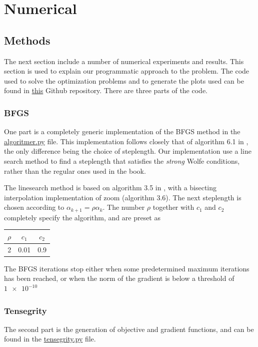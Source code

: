 \section{Numerical}
\subsection{Methods}
The next section include a number of numerical experiments and results. This section is used to explain our programmatic approach to the problem. The code used to solve the optimization problems and to generate the plots used can be found in \href{https://github.com/otkulseng/Opt1_Project}{this} Github repository. There are three parts of the code. 
\subsubsection{BFGS}
One part is a completely generic implementation of the BFGS method in the \href{https://github.com/otkulseng/Opt1_Project/blob/main/Kode/algoritmer.py}{algoritmer.py} file. This implementation follows closely that of algorithm 6.1 in \cite{NW}, the only difference being the choice of steplength. Our implementation use a line search method to find a steplength that satisfies the \emph{strong} Wolfe conditions, rather than the regular ones used in the book.

The linesearch method is based on algorithm 3.5 in \cite{NW}, with a bisecting interpolation implementation of zoom (algorithm 3.6). The next steplength is chosen according to $\alpha_{k+1} = \rho \alpha_k$. The number $\rho$ together with $c_1$ and $c_2$ completely specify the algorithm, and are preset as

\begin{tabular}{||c c c||} 
 \hline
 $\rho$ & $c_1$ & $c_2$ \\ [0.5ex] 
 \hline
2 & 0.01 & 0.9  \\ 
 \hline
\end{tabular}

The BFGS iterations stop either when some predetermined maximum iterations has been reached, or when the norm of the gradient is below a threshold of $\num{1e-10}$

\subsubsection{Tensegrity}
The second part is the generation of objective and gradient functions, and can be found in the \href{https://github.com/otkulseng/Opt1_Project/blob/main/Kode/tensegrity.py}{tensegrity.py} file. 

